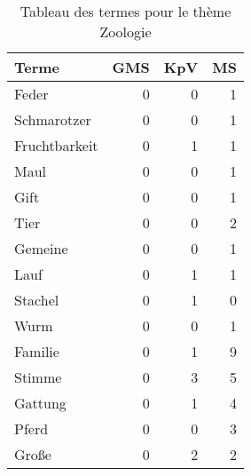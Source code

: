 
\begin{table}[ht]
\centering
\caption{Tableau des termes pour le thème Zoologie}
\label{tab:Zoologie}
\begin{tabular}{lrrr}
\hline
 Terme         &   GMS &   KpV &   MS \\
\hline
 Feder         &     0 &     0 &    1 \\
 Schmarotzer   &     0 &     0 &    1 \\
 Fruchtbarkeit &     0 &     1 &    1 \\
 Maul          &     0 &     0 &    1 \\
 Gift          &     0 &     0 &    1 \\
 Tier          &     0 &     0 &    2 \\
 Gemeine       &     0 &     0 &    1 \\
 Lauf          &     0 &     1 &    1 \\
 Stachel       &     0 &     1 &    0 \\
 Wurm          &     0 &     0 &    1 \\
 Familie       &     0 &     1 &    9 \\
 Stimme        &     0 &     3 &    5 \\
 Gattung       &     0 &     1 &    4 \\
 Pferd         &     0 &     0 &    3 \\
 Große         &     0 &     2 &    2 \\
\hline
\end{tabular}
\end{table}
    